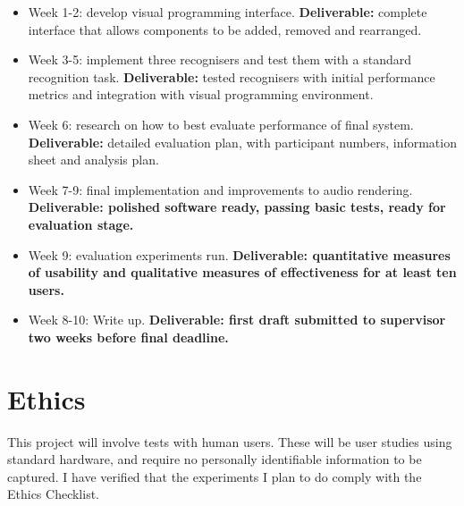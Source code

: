 \documentclass[11pt]{article}
\providecommand{\tightlist}{%
\setlength{\itemsep}{0pt}\setlength{\parskip}{0pt}}
\begin{document}
\begin{itemize}
    \tightlist
    \item
      Week 1-2: develop visual programming interface. \textbf{Deliverable:}
      complete interface that allows components to be added, removed and
      rearranged.
    \item
      Week 3-5: implement three recognisers and test them with a standard
      recognition task. \textbf{Deliverable:} tested recognisers with
      initial performance metrics and integration with visual programming
      environment.
    \item
      Week 6: research on how to best evaluate performance of final system.
      \textbf{Deliverable:} detailed evaluation plan, with participant
      numbers, information sheet and analysis plan.
    \item
      Week 7-9: final implementation and improvements to audio rendering.
      \textbf{Deliverable: polished software ready, passing basic tests,
      ready for evaluation stage.}
    \item
      Week 9: evaluation experiments run. \textbf{Deliverable: quantitative
      measures of usability and qualitative measures of effectiveness for at
      least ten users.}
    \item
      Week 8-10: Write up. \textbf{Deliverable: first draft submitted to
      supervisor two weeks before final deadline.}
    \end{itemize}
    

\section{Ethics}

This project will involve tests with human users.  These will be user studies
using standard hardware, and require no personally identifiable information to be captured.
I have verified that the experiments I plan to do comply with the Ethics Checklist.
\end{document}
